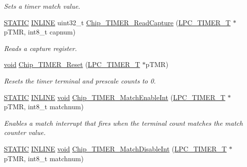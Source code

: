 \begin{DoxyCompactItemize}
\begin{DoxyCompactList}\small\item\em Sets a timer match value. \end{DoxyCompactList}\item 
\hyperlink{group__LPC__Types__Public__Macros_ga10b2d890d871e1489bb02b7e70d9bdfb}{S\-T\-A\-T\-I\-C} \hyperlink{group__LPC__Types__Public__Types_ga2eb6f9e0395b47b8d5e3eeae4fe0c116}{I\-N\-L\-I\-N\-E} uint32\-\_\-t \hyperlink{group__TIMER__17XX__40XX_ga7eab047dd60eef7fb0f042266f9dae05}{Chip\-\_\-\-T\-I\-M\-E\-R\-\_\-\-Read\-Capture} (\hyperlink{structLPC__TIMER__T}{L\-P\-C\-\_\-\-T\-I\-M\-E\-R\-\_\-\-T} $\ast$p\-T\-M\-R, int8\-\_\-t capnum)
\begin{DoxyCompactList}\small\item\em Reads a capture register. \end{DoxyCompactList}\item 
\hyperlink{Paradigm_2Tern__EE_2small_2portmacro_8h_a14d32f8130d3c0b212cfc751730b5b49}{void} \hyperlink{group__TIMER__17XX__40XX_gaba0336e88cc662505e2dde1eabff1aaf}{Chip\-\_\-\-T\-I\-M\-E\-R\-\_\-\-Reset} (\hyperlink{structLPC__TIMER__T}{L\-P\-C\-\_\-\-T\-I\-M\-E\-R\-\_\-\-T} $\ast$p\-T\-M\-R)
\begin{DoxyCompactList}\small\item\em Resets the timer terminal and prescale counts to 0. \end{DoxyCompactList}\item 
\hyperlink{group__LPC__Types__Public__Macros_ga10b2d890d871e1489bb02b7e70d9bdfb}{S\-T\-A\-T\-I\-C} \hyperlink{group__LPC__Types__Public__Types_ga2eb6f9e0395b47b8d5e3eeae4fe0c116}{I\-N\-L\-I\-N\-E} \hyperlink{Paradigm_2Tern__EE_2small_2portmacro_8h_a14d32f8130d3c0b212cfc751730b5b49}{void} \hyperlink{group__TIMER__17XX__40XX_ga21daeb9b42a0f7fe57ec52f3815ab223}{Chip\-\_\-\-T\-I\-M\-E\-R\-\_\-\-Match\-Enable\-Int} (\hyperlink{structLPC__TIMER__T}{L\-P\-C\-\_\-\-T\-I\-M\-E\-R\-\_\-\-T} $\ast$p\-T\-M\-R, int8\-\_\-t matchnum)
\begin{DoxyCompactList}\small\item\em Enables a match interrupt that fires when the terminal count matches the match counter value. \end{DoxyCompactList}\item 
\hyperlink{group__LPC__Types__Public__Macros_ga10b2d890d871e1489bb02b7e70d9bdfb}{S\-T\-A\-T\-I\-C} \hyperlink{group__LPC__Types__Public__Types_ga2eb6f9e0395b47b8d5e3eeae4fe0c116}{I\-N\-L\-I\-N\-E} \hyperlink{Paradigm_2Tern__EE_2small_2portmacro_8h_a14d32f8130d3c0b212cfc751730b5b49}{void} \hyperlink{group__TIMER__17XX__40XX_ga81252a6e24fddbf78d62f791f589306e}{Chip\-\_\-\-T\-I\-M\-E\-R\-\_\-\-Match\-Disable\-Int} (\hyperlink{structLPC__TIMER__T}{L\-P\-C\-\_\-\-T\-I\-M\-E\-R\-\_\-\-T} $\ast$p\-T\-M\-R, int8\-\_\-t matchnum)

\end{DoxyCompactItemize}
